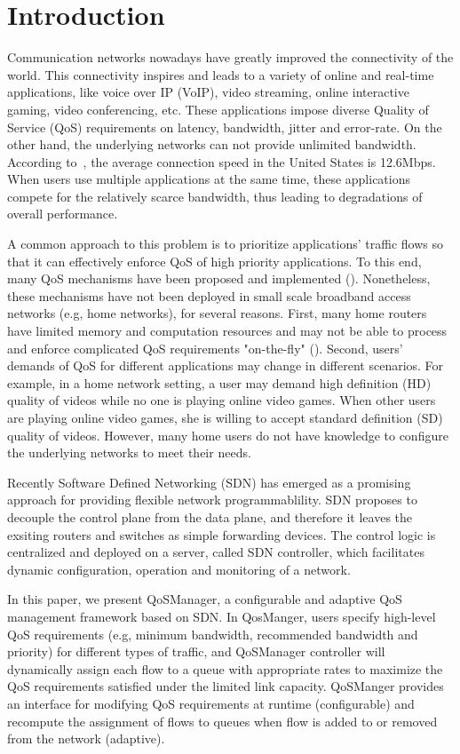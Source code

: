 \section{Introduction}
\label{sect:intro}

Communication networks nowadays have greatly improved the connectivity of the world. This connectivity
inspires and leads to a variety of online and real-time applications, like voice over IP (VoIP), video
streaming, online interactive gaming, video conferencing, etc. These applications impose diverse Quality
of Service (QoS) requirements on latency, bandwidth, jitter and error-rate. On the other hand, the
underlying networks can not provide unlimited bandwidth. According to~\cite{akamai}, the average
connection speed in the United States is 12.6Mbps. When users use multiple applications at the same time,
these applications compete for the relatively scarce bandwidth, thus leading to degradations of overall
performance.

A common approach to this problem is to prioritize applications' traffic flows so that it can effectively
enforce QoS of high priority applications. To this end, many QoS mechanisms have been proposed and
implemented (). Nonetheless, these mechanisms have not been deployed in small scale broadband
access networks (e.g, home networks), for several reasons. First, many home routers have limited memory and
computation resources and may not be able to process and enforce complicated QoS requirements "on-the-fly"
(). Second, users' demands of QoS for different applications may change in different scenarios. 
For example, in a home network setting, a user may demand high definition (HD) quality of videos while no one
is playing online video games. When other users are playing online video games, she is willing to accept standard
definition (SD) quality of videos. However, many home users do not have knowledge to configure the underlying
networks to meet their needs.

Recently Software Defined Networking (SDN) has emerged as a promising approach for providing flexible network
programmablility. SDN proposes to decouple the control plane from the data plane, and therefore it leaves the
exsiting routers and switches as simple forwarding devices. The control logic is centralized and deployed on a
server, called SDN controller, which facilitates dynamic configuration, operation and monitoring of a network.

In this paper, we present QoSManager, a configurable and adaptive QoS management framework based on SDN. In
QosManger, users specify high-level QoS requirements (e.g, minimum bandwidth, recommended bandwidth and priority)
for different types of traffic, and QoSManager controller will dynamically assign each flow to a queue with
appropriate rates to maximize the QoS requirements satisfied under the limited link capacity. QoSManger provides an
interface for modifying QoS requirements at runtime (configurable) and recompute the assignment of flows to queues
when flow is added to or removed from the network (adaptive).

